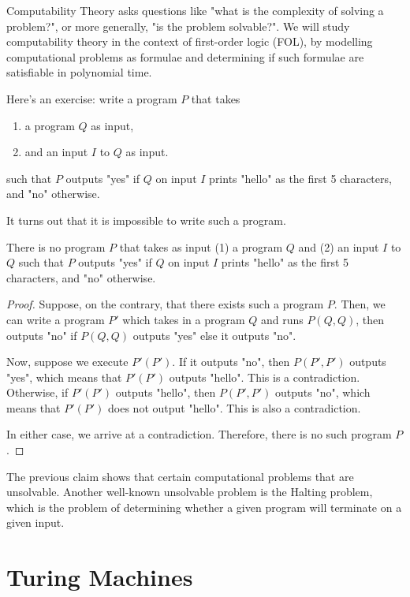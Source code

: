 \documentclass[11pt,usenames, dvipsnames]{article}
\begin{document}
Computability Theory asks questions like "what is the complexity of solving a problem?", or more generally, "is the problem solvable?". We will study computability theory in the context of first-order logic (FOL), by modelling computational problems as formulae and determining if such formulae are satisfiable in polynomial time.

Here's an exercise: write a program $P$ that takes
\begin{enumerate}
  \item a program $Q$ as input,
  \item and an input $I$ to $Q$ as input.
\end{enumerate}
such that $P$ outputs "yes" if $Q$ on input $I$ prints "hello" as the first 5 characters, and "no" otherwise.

It turns out that it is impossible to write such a program.

\begin{claim}
  There is no program $P$ that takes as input (1) a program $Q$ and (2) an input $I$ to $Q$ such that $P$ outputs "yes" if $Q$ on input $I$ prints "hello" as the first 5 characters, and "no" otherwise.
\end{claim}

\begin{proof}
  Suppose, on the contrary, that there exists such a program $P$. Then, we can write a program $P'$ which takes in a program $Q$ and runs $P(Q, Q)$, then outputs "no" if $P(Q, Q)$ outputs "yes" else it outputs "no".

  Now, suppose we execute $P'(P')$. If it outputs "no", then $P(P', P')$ outputs "yes", which means that $P'(P')$ outputs "hello". This is a contradiction. Otherwise, if $P'(P')$ outputs "hello", then $P(P', P')$ outputs "no", which means that $P'(P')$ does not output "hello". This is also a contradiction.

  In either case, we arrive at a contradiction. Therefore, there is no such program $P$.
\end{proof}

The previous claim shows that certain computational problems that are unsolvable. Another well-known unsolvable problem is the Halting problem, which is the problem of determining whether a given program will terminate on a given input.

\section*{\large \centering Turing Machines}
\noindent
\end{document}

